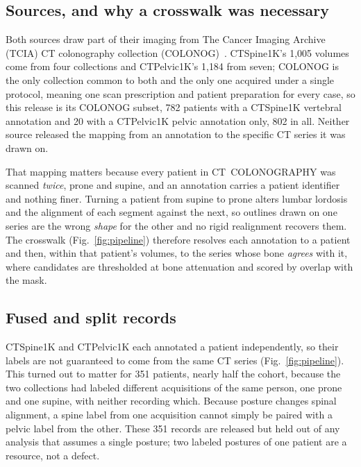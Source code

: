 \documentclass[aapm,mph,amsmath,amssymb,reprint]{revtex4-2}
\begin{document}
\subsection{Sources, and why a crosswalk was necessary}\label{sec:sources}

Both sources draw part of their imaging from The Cancer Imaging Archive (TCIA) CT
colonography collection (COLONOG)~\cite{colonog,tcia}. CTSpine1K's 1{,}005 volumes come from four
collections and CTPelvic1K's 1{,}184 from seven; COLONOG is the only collection common to
both and the only one acquired under a single protocol, meaning one scan prescription and
patient preparation for every case, so this release is its COLONOG subset, 782 patients with a CTSpine1K vertebral annotation and 20 with a CTPelvic1K pelvic
annotation only, 802 in all. Neither source released the mapping from an annotation to the
specific CT series it was drawn on.

That mapping matters because every patient in CT~COLONOGRAPHY was scanned \emph{twice},
prone and supine, and an annotation carries a patient identifier and nothing finer. Turning
a patient from supine to prone alters lumbar lordosis and the alignment of each segment
against the next, so outlines drawn on one series are the wrong \emph{shape} for the other
and no rigid realignment recovers them. The crosswalk (Fig.~\ref{fig:pipeline}) therefore
resolves each annotation to a patient and then, within that patient's volumes, to the series
whose bone \emph{agrees} with it, where candidates are thresholded at bone attenuation and scored
by overlap with the mask.

\subsection{Fused and split records}

CTSpine1K and CTPelvic1K each annotated a patient independently, so their labels are not guaranteed to come from the same CT series (Fig.~\ref{fig:pipeline}). This turned out to matter for 351 patients, nearly half the cohort, because the two collections had labeled different acquisitions of the same person, one prone and one supine, with neither recording which. Because posture changes spinal alignment, a spine label from one acquisition cannot simply be paired with a pelvic label from the other. These 351 records are released but held out of any analysis that assumes a single posture; two labeled postures of one patient are a resource, not a defect. 
\end{document}
